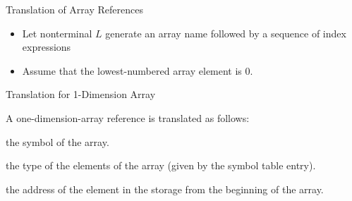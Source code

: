 \begin{bibunit}[apalike]
\begin{frame}{Translation of Array References}
	\vfill
	\begin{itemize}
	\item Let nonterminal $L$ generate an array name followed by a sequence of index expressions
		\begin{center}
		\end{center}
	\vfill
	\item Assume that the lowest-numbered array element is $0$.
	\end{itemize}
\end{frame}

\begin{frame}{Translation for 1-Dimension Array}
	\begin{description}
	\item A one-dimension-array reference is translated as follows:
		\begin{footnotesize}
		\begin{sdd}
		\end{sdd}
		\end{footnotesize}
	\vfill
	\item[Attribute "base"] the symbol of the array.
	\item[Attribute "type"] the type of the elements of the array (given by the symbol table entry).
	\item[Attribute "addr"] the address of the element in the storage from the beginning of the array.
	\end{description}
\end{frame}


\end{bibunit}
